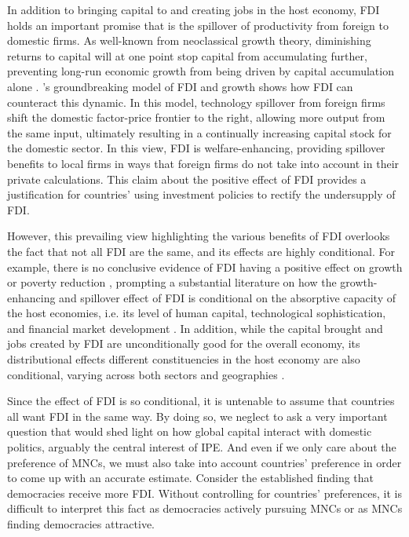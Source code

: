 In addition to bringing capital to and creating jobs in the host economy, FDI
holds an important promise that is the spillover of productivity from foreign to
domestic firms. As well-known from neoclassical growth theory, diminishing
returns to capital will at one point stop capital from accumulating further,
preventing long-run economic growth from being driven by capital accumulation
alone \citep{Solow1956}. \citet{Findlay1978}'s groundbreaking model of FDI and
growth shows how FDI can counteract this dynamic. In this model, technology spillover from foreign firms shift the domestic
factor-price frontier to the right, allowing more output from the same input,
ultimately resulting in a continually increasing capital stock for the domestic
sector. In this view, FDI is welfare-enhancing, providing spillover benefits to
local firms in ways that foreign firms do not take into account in their private
calculations. This claim about the positive effect
of FDI provides a justification for countries' using investment policies to rectify the undersupply of FDI. 

However, this prevailing view highlighting the various benefits of FDI overlooks
the fact that not all FDI are the same, and its effects are highly conditional.
For example, there is no conclusive evidence of FDI having a positive effect on
growth \citep{Nair-Reichert2001, Carkovic2002} or poverty reduction
\citep{Guerra2009}, prompting a substantial literature on how the
growth-enhancing and spillover effect of FDI is conditional on the absorptive
capacity of the host economies, i.e. its level of human capital, technological
sophistication, and financial market development \citep{Durham2004,
  Nunnenkamp2004, Fu2008, Willem2004}. In addition, while the capital brought
and jobs created by FDI are unconditionally good for the overall economy, its
distributional effects different constituencies in the host economy are also
conditional, varying across both sectors and geographies \citep{Chintrakarn2012,
  Goldberg2007, Nunnenkamp2007}.

Since the effect of FDI is so conditional, it is untenable to assume that
countries all want FDI in the same way. By doing so, we neglect to
ask a very important question that would shed light on how global capital
interact with domestic politics, arguably the central interest of IPE. And even
if we only care about the preference of MNCs, we must also take into account
countries' preference in order to come up with an accurate estimate. Consider
the established finding that democracies receive more FDI. Without controlling
for countries' preferences, it is difficult to interpret this fact as
democracies actively pursuing MNCs or as MNCs finding democracies attractive.

